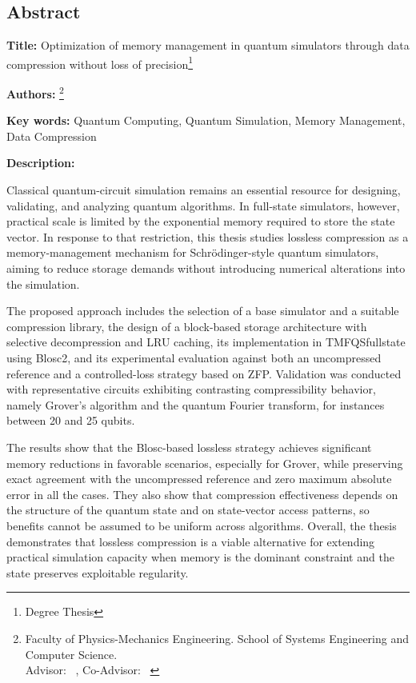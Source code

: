 \newpage

\begin{singlespace}
\section*{Abstract}

\textbf{Title:} {Optimization of memory management in quantum simulators through data\\ compression without loss of precision}\footnote{Degree Thesis}

\textbf{Authors:} \nam\footnote{Faculty of Physics-Mechanics Engineering. School of Systems Engineering and Computer
Science.\\ Advisor: \tdir\ \dir, Co-Advisor: \tcdir\ \cdir }

\textbf{Key words:} { Quantum Computing, Quantum Simulation, Memory Management, Data Compression }

\textbf{Description:}

Classical quantum-circuit simulation remains an essential resource for designing, validating, and analyzing quantum algorithms. In full-state simulators, however, practical scale is limited by the exponential memory required to store the state vector. In response to that restriction, this thesis studies lossless compression as a memory-management mechanism for Schr\"odinger-style quantum simulators, aiming to reduce storage demands without introducing numerical alterations into the simulation.

The proposed approach includes the selection of a base simulator and a suitable compression library, the design of a block-based storage architecture with selective decompression and LRU caching, its implementation in TMFQSfullstate using Blosc2, and its experimental evaluation against both an uncompressed reference and a controlled-loss strategy based on ZFP. Validation was conducted with representative circuits exhibiting contrasting compressibility behavior, namely Grover's algorithm and the quantum Fourier transform, for instances between 20 and 25 qubits.

The results show that the Blosc-based lossless strategy achieves significant memory reductions in favorable scenarios, especially for Grover, while preserving exact agreement with the uncompressed reference and zero maximum absolute error in all the cases. They also show that compression effectiveness depends on the structure of the quantum state and on state-vector access patterns, so benefits cannot be assumed to be uniform across algorithms. Overall, the thesis demonstrates that lossless compression is a viable alternative for extending practical simulation capacity when memory is the dominant constraint and the state preserves exploitable regularity.
\end{singlespace}

\newpage
